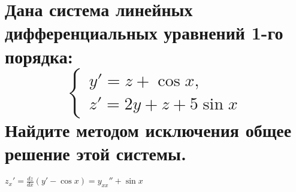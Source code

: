 \documentclass{article}
\begin{document}
    
    
    

\newpage
    \section{Дана система линейных дифференциальных уравнений 1-го порядка:
    \begin{equation*}
        \begin{cases}
            y' = z + \cos x, \\
            z' = 2y + z + 5 \sin x
        \end{cases}
    \end{equation*}
    Найдите методом исключения общее решение этой системы.
    }
    $z_x' = \frac{dz}{dx}(y'- \cos x) = y_{xx}'' + \sin x$
\end{document}
